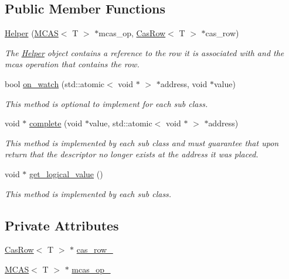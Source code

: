 \subsection*{Public Member Functions}
\begin{DoxyCompactItemize}
\item 
\hyperlink{classtervel_1_1algorithms_1_1wf_1_1mcas_1_1_helper_adf95331e5787d82f619057cbccdf1905}{Helper} (\hyperlink{classtervel_1_1algorithms_1_1wf_1_1mcas_1_1_m_c_a_s}{M\+C\+A\+S}$<$ T $>$ $\ast$mcas\+\_\+op, \hyperlink{classtervel_1_1algorithms_1_1wf_1_1mcas_1_1_cas_row}{Cas\+Row}$<$ T $>$ $\ast$cas\+\_\+row)
\begin{DoxyCompactList}\small\item\em The \hyperlink{classtervel_1_1algorithms_1_1wf_1_1mcas_1_1_helper}{Helper} object contains a reference to the row it is associated with and the mcas operation that contains the row. \end{DoxyCompactList}\item 
bool \hyperlink{classtervel_1_1algorithms_1_1wf_1_1mcas_1_1_helper_a381449ae3b9624302008a581610f76b5}{on\+\_\+watch} (std\+::atomic$<$ void $\ast$ $>$ $\ast$address, void $\ast$value)
\begin{DoxyCompactList}\small\item\em This method is optional to implement for each sub class. \end{DoxyCompactList}\item 
void $\ast$ \hyperlink{classtervel_1_1algorithms_1_1wf_1_1mcas_1_1_helper_a952a74178febcf25e6f3fe6d3fd8f691}{complete} (void $\ast$value, std\+::atomic$<$ void $\ast$ $>$ $\ast$address)
\begin{DoxyCompactList}\small\item\em This method is implemented by each sub class and must guarantee that upon return that the descriptor no longer exists at the address it was placed. \end{DoxyCompactList}\item 
void $\ast$ \hyperlink{classtervel_1_1algorithms_1_1wf_1_1mcas_1_1_helper_ad7fbc9ead7553cb023b0ecec2eaf45d4}{get\+\_\+logical\+\_\+value} ()
\begin{DoxyCompactList}\small\item\em This method is implemented by each sub class. \end{DoxyCompactList}\end{DoxyCompactItemize}
\subsection*{Private Attributes}
\begin{DoxyCompactItemize}
\item 
\hyperlink{classtervel_1_1algorithms_1_1wf_1_1mcas_1_1_cas_row}{Cas\+Row}$<$ T $>$ $\ast$ \hyperlink{classtervel_1_1algorithms_1_1wf_1_1mcas_1_1_helper_a1dc09a369e400a1d0dc37e505b585932}{cas\+\_\+row\+\_\+}
\item 
\hyperlink{classtervel_1_1algorithms_1_1wf_1_1mcas_1_1_m_c_a_s}{M\+C\+A\+S}$<$ T $>$ $\ast$ \hyperlink{classtervel_1_1algorithms_1_1wf_1_1mcas_1_1_helper_a50a2eb6601553b9110c408f7981b7f15}{mcas\+\_\+op\+\_\+}
\end{DoxyCompactItemize}


